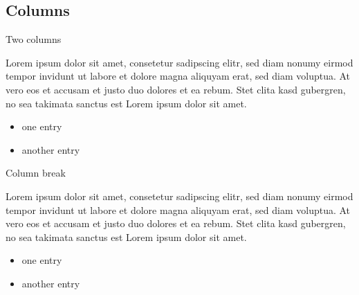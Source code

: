 \documentclass[xcolor={svgnames},12pt,aspectratio=169,handout]{beamer}
\begin{document}

\subsection{Columns}

\begin{frame}{Two columns}
    \begin{multicols}{2}
        Lorem ipsum dolor sit amet, consetetur sadipscing elitr, sed diam nonumy eirmod tempor invidunt ut labore et dolore magna aliquyam erat, sed diam voluptua. At vero eos et accusam et justo duo dolores et ea rebum. Stet clita kasd gubergren, no sea takimata sanctus est Lorem ipsum dolor sit amet.

        \begin{itemize}
            \item one entry
            \item another entry
        \end{itemize}
    \end{multicols}
\end{frame}

\begin{frame}{Column break}
    \begin{multicols}{2}
        Lorem ipsum dolor sit amet, consetetur sadipscing elitr, sed diam nonumy eirmod tempor invidunt ut labore et dolore magna aliquyam erat, sed diam voluptua. At vero eos et accusam et justo duo dolores et ea rebum. Stet clita kasd gubergren, no sea takimata sanctus est Lorem ipsum dolor sit amet.

        \columnbreak
        \begin{itemize}
            \item one entry
            \item another entry
        \end{itemize}
    \end{multicols}
\end{frame}
\end{document}
